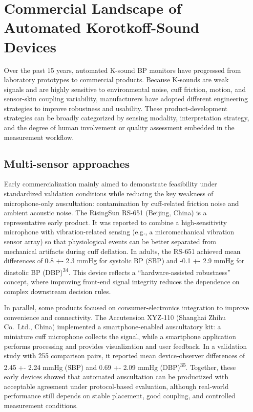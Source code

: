 \documentclass[
  12pt,
  letterpaper,
  openany,
  oneside]{book}
\begin{document}
\section{Commercial Landscape of Automated Korotkoff-Sound
Devices}\label{commercial-landscape-of-automated-korotkoff-sound-devices}

Over the past 15 years, automated K-sound BP monitors have progressed
from laboratory prototypes to commercial products. Because K-sounds are
weak signals and are highly sensitive to environmental noise, cuff
friction, motion, and sensor-skin coupling variability, manufacturers
have adopted different engineering strategies to improve robustness and
usability. These product-development strategies can be broadly
categorized by sensing modality, interpretation strategy, and the degree
of human involvement or quality assessment embedded in the measurement
workflow.

\subsection{Multi-sensor approaches}\label{multi-sensor-approaches}

Early commercialization mainly aimed to demonstrate feasibility under
standardized validation conditions while reducing the key weakness of
microphone-only auscultation: contamination by cuff-related friction
noise and ambient acoustic noise. The RisingSun RS-651 (Beijing, China)
is a representative early product. It was reported to combine a
high-sensitivity microphone with vibration-related sensing (e.g., a
micromechanical vibration sensor array) so that physiological events can
be better separated from mechanical artifacts during cuff deflation. In
adults, the RS-651 achieved mean differences of 0.8 +- 2.3 mmHg for
systolic BP (SBP) and -0.1 +- 2.9 mmHg for diastolic BP
(DBP)\textsuperscript{34}. This device reflects a ``hardware-assisted
robustness'' concept, where improving front-end signal integrity reduces
the dependence on complex downstream decision rules.

In parallel, some products focused on consumer-electronics integration
to improve convenience and connectivity. The Accutension XYZ-110
(Shanghai Zhihu Co.~Ltd., China) implemented a smartphone-enabled
auscultatory kit: a miniature cuff microphone collects the signal, while
a smartphone application performs processing and provides visualization
and user feedback. In a validation study with 255 comparison pairs, it
reported mean device-observer differences of 2.45 +- 2.24 mmHg (SBP) and
0.69 +- 2.09 mmHg (DBP)\textsuperscript{35}. Together, these early
devices showed that automated auscultation can be productized with
acceptable agreement under protocol-based evaluation, although
real-world performance still depends on stable placement, good coupling,
and controlled measurement conditions.
\end{document}
